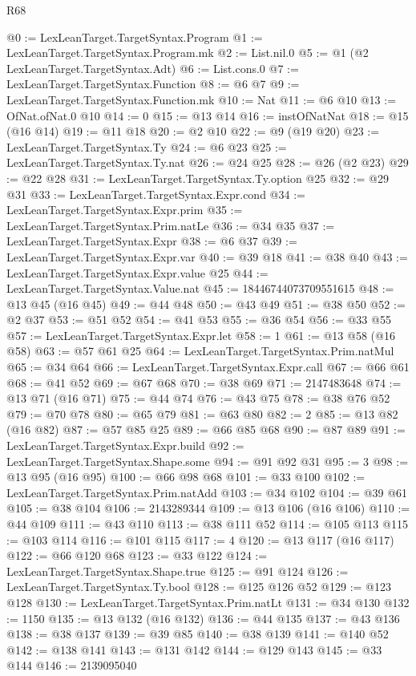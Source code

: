 \begin{lexlean}{R68}
\begin{coremodule}
@0 := LexLeanTarget.TargetSyntax.Program
@1 := LexLeanTarget.TargetSyntax.Program.mk
@2 := List.nil.{0}
@5 := @1 (@2 LexLeanTarget.TargetSyntax.Adt)
@6 := List.cons.{0}
@7 := LexLeanTarget.TargetSyntax.Function
@8 := @6 @7
@9 := LexLeanTarget.TargetSyntax.Function.mk
@10 := Nat
@11 := @6 @10
@13 := OfNat.ofNat.{0} @10
@14 := 0
@15 := @13 @14
@16 := instOfNatNat
@18 := @15 (@16 @14)
@19 := @11 @18
@20 := @2 @10
@22 := @9 (@19 @20)
@23 := LexLeanTarget.TargetSyntax.Ty
@24 := @6 @23
@25 := LexLeanTarget.TargetSyntax.Ty.nat
@26 := @24 @25
@28 := @26 (@2 @23)
@29 := @22 @28
@31 := LexLeanTarget.TargetSyntax.Ty.option @25
@32 := @29 @31
@33 := LexLeanTarget.TargetSyntax.Expr.cond
@34 := LexLeanTarget.TargetSyntax.Expr.prim
@35 := LexLeanTarget.TargetSyntax.Prim.natLe
@36 := @34 @35
@37 := LexLeanTarget.TargetSyntax.Expr
@38 := @6 @37
@39 := LexLeanTarget.TargetSyntax.Expr.var
@40 := @39 @18
@41 := @38 @40
@43 := LexLeanTarget.TargetSyntax.Expr.value @25
@44 := LexLeanTarget.TargetSyntax.Value.nat
@45 := 18446744073709551615
@48 := @13 @45 (@16 @45)
@49 := @44 @48
@50 := @43 @49
@51 := @38 @50
@52 := @2 @37
@53 := @51 @52
@54 := @41 @53
@55 := @36 @54
@56 := @33 @55
@57 := LexLeanTarget.TargetSyntax.Expr.let
@58 := 1
@61 := @13 @58 (@16 @58)
@63 := @57 @61 @25
@64 := LexLeanTarget.TargetSyntax.Prim.natMul
@65 := @34 @64
@66 := LexLeanTarget.TargetSyntax.Expr.call
@67 := @66 @61
@68 := @41 @52
@69 := @67 @68
@70 := @38 @69
@71 := 2147483648
@74 := @13 @71 (@16 @71)
@75 := @44 @74
@76 := @43 @75
@78 := @38 @76 @52
@79 := @70 @78
@80 := @65 @79
@81 := @63 @80
@82 := 2
@85 := @13 @82 (@16 @82)
@87 := @57 @85 @25
@89 := @66 @85 @68
@90 := @87 @89
@91 := LexLeanTarget.TargetSyntax.Expr.build
@92 := LexLeanTarget.TargetSyntax.Shape.some
@94 := @91 @92 @31
@95 := 3
@98 := @13 @95 (@16 @95)
@100 := @66 @98 @68
@101 := @33 @100
@102 := LexLeanTarget.TargetSyntax.Prim.natAdd
@103 := @34 @102
@104 := @39 @61
@105 := @38 @104
@106 := 2143289344
@109 := @13 @106 (@16 @106)
@110 := @44 @109
@111 := @43 @110
@113 := @38 @111 @52
@114 := @105 @113
@115 := @103 @114
@116 := @101 @115
@117 := 4
@120 := @13 @117 (@16 @117)
@122 := @66 @120 @68
@123 := @33 @122
@124 := LexLeanTarget.TargetSyntax.Shape.true
@125 := @91 @124
@126 := LexLeanTarget.TargetSyntax.Ty.bool
@128 := @125 @126 @52
@129 := @123 @128
@130 := LexLeanTarget.TargetSyntax.Prim.natLt
@131 := @34 @130
@132 := 1150
@135 := @13 @132 (@16 @132)
@136 := @44 @135
@137 := @43 @136
@138 := @38 @137
@139 := @39 @85
@140 := @38 @139
@141 := @140 @52
@142 := @138 @141
@143 := @131 @142
@144 := @129 @143
@145 := @33 @144
@146 := 2139095040

\end{coremodule}
\end{lexlean}
